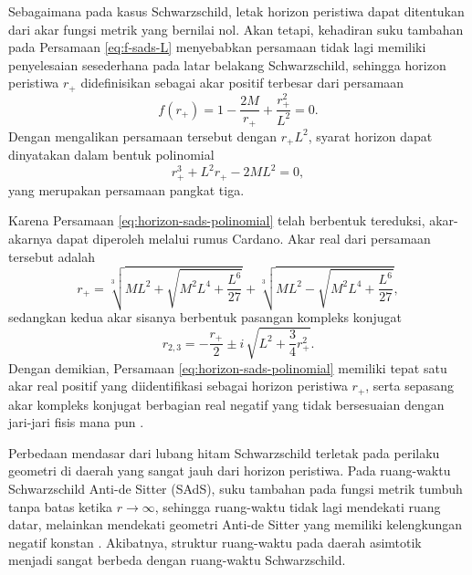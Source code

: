 Sebagaimana pada kasus Schwarzschild, letak horizon peristiwa dapat ditentukan dari akar
fungsi metrik yang bernilai nol. Akan tetapi, kehadiran suku tambahan pada Persamaan
\eqref{eq:f-sads-L} menyebabkan persamaan tidak lagi memiliki penyelesaian sesederhana
pada latar belakang Schwarzschild, sehingga horizon peristiwa $r_+$ didefinisikan sebagai
akar positif terbesar dari persamaan
\begin{equation}
    f(r_+) = 1 - \frac{2M}{r_+} + \frac{r_+^2}{L^2} = 0.
    \label{eq:horizon-sads}
\end{equation}
Dengan mengalikan persamaan tersebut dengan $r_+ L^2$, syarat horizon dapat dinyatakan
dalam bentuk polinomial
\begin{equation}
    r_+^3 + L^2 r_+ - 2M L^2 = 0,
    \label{eq:horizon-sads-polinomial}
\end{equation}
yang merupakan persamaan pangkat tiga.

Karena Persamaan \eqref{eq:horizon-sads-polinomial} telah berbentuk tereduksi, akar-akarnya
dapat diperoleh melalui rumus Cardano. Akar real dari persamaan tersebut adalah
\begin{equation}
    r_+ = \sqrt[3]{M L^2 + \sqrt{M^2 L^4 + \frac{L^6}{27}}}
        + \sqrt[3]{M L^2 - \sqrt{M^2 L^4 + \frac{L^6}{27}}},
    \label{eq:horizon-cardano-sads}
\end{equation}
sedangkan kedua akar sisanya berbentuk pasangan kompleks konjugat
\begin{equation}
    r_{2,3} = -\frac{r_+}{2} \pm i\,\sqrt{L^2 + \frac{3}{4} r_+^2}.
    \label{eq:akar-kompleks-sads}
\end{equation}
Dengan demikian, Persamaan \eqref{eq:horizon-sads-polinomial} memiliki tepat satu akar real
positif yang diidentifikasi sebagai horizon peristiwa $r_+$, serta sepasang akar kompleks
konjugat berbagian real negatif yang tidak bersesuaian dengan jari-jari fisis mana pun
\parencite{Horowitz2000}.

Perbedaan mendasar dari lubang hitam Schwarzschild terletak pada perilaku geometri di daerah
yang sangat jauh dari horizon peristiwa. Pada ruang-waktu Schwarzschild Anti-de Sitter (SAdS),
suku tambahan pada fungsi metrik tumbuh tanpa batas ketika $r \rightarrow \infty$, sehingga
ruang-waktu tidak lagi mendekati ruang datar, melainkan mendekati geometri Anti-de Sitter
yang memiliki kelengkungan negatif konstan \parencite{Horowitz2000}. Akibatnya, struktur
ruang-waktu pada daerah asimtotik menjadi sangat berbeda dengan ruang-waktu Schwarzschild.

